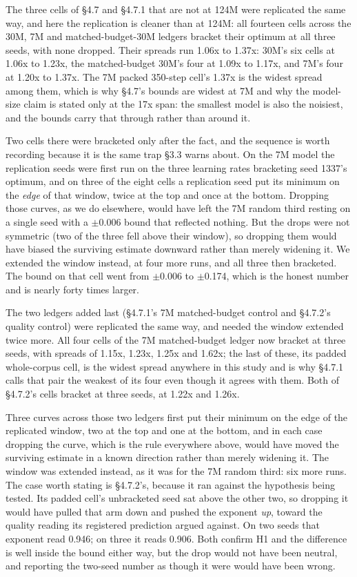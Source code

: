\documentclass[11pt]{article}
\begin{document}
The three cells of \S{}4.7 and \S{}4.7.1 that are not at 124M were replicated the same way, and here the replication is cleaner than at 124M: all fourteen cells across the 30M, 7M and matched-budget-30M ledgers bracket their optimum at all three seeds, with none dropped. Their spreads run 1.06x to 1.37x: 30M's six cells at 1.06x to 1.23x, the matched-budget 30M's four at 1.09x to 1.17x, and 7M's four at 1.20x to 1.37x. The 7M packed 350-step cell's 1.37x is the widest spread among them, which is why \S{}4.7's bounds are widest at 7M and why the model-size claim is stated only at the 17x span: the smallest model is also the noisiest, and the bounds carry that through rather than around it.

Two cells there were bracketed only after the fact, and the sequence is worth recording because it is the same trap \S{}3.3 warns about. On the 7M model the replication seeds were first run on the three learning rates bracketing seed 1337's optimum, and on three of the eight cells a replication seed put its minimum on the \emph{edge} of that window, twice at the top and once at the bottom. Dropping those curves, as we do elsewhere, would have left the 7M random third resting on a single seed with a $\pm$0.006 bound that reflected nothing. But the drops were not symmetric (two of the three fell above their window), so dropping them would have biased the surviving estimate downward rather than merely widening it. We extended the window instead, at four more runs, and all three then bracketed. The bound on that cell went from $\pm$0.006 to $\pm$0.174, which is the honest number and is nearly forty times larger.

The two ledgers added last (\S{}4.7.1's 7M matched-budget control and \S{}4.7.2's quality control) were replicated the same way, and needed the window extended twice more. All four cells of the 7M matched-budget ledger now bracket at three seeds, with spreads of 1.15x, 1.23x, 1.25x and 1.62x; the last of these, its padded whole-corpus cell, is the widest spread anywhere in this study and is why \S{}4.7.1 calls that pair the weakest of its four even though it agrees with them. Both of \S{}4.7.2's cells bracket at three seeds, at 1.22x and 1.26x.

Three curves across those two ledgers first put their minimum on the edge of the replicated window, two at the top and one at the bottom, and in each case dropping the curve, which is the rule everywhere above, would have moved the surviving estimate in a known direction rather than merely widening it. The window was extended instead, as it was for the 7M random third: six more runs. The case worth stating is \S{}4.7.2's, because it ran against the hypothesis being tested. Its padded cell's unbracketed seed sat above the other two, so dropping it would have pulled that arm down and pushed the exponent \emph{up}, toward the quality reading its registered prediction argued against. On two seeds that exponent read 0.946; on three it reads 0.906. Both confirm H1 and the difference is well inside the bound either way, but the drop would not have been neutral, and reporting the two-seed number as though it were would have been wrong.
\end{document}
